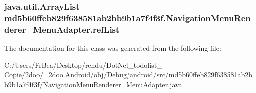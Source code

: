 \hypertarget{classmd5b60ffeb829f638581ab2bb9b1a7f4f3f_1_1_navigation_menu_renderer___menu_adapter_816f51fd01db11b07020f12e0694cf61}{
\subsubsection[{refList}]{\setlength{\rightskip}{0pt plus 5cm}java.util.ArrayList {\bf md5b60ffeb829f638581ab2bb9b1a7f4f3f.NavigationMenuRenderer\_\-MenuAdapter.refList}}}
\label{classmd5b60ffeb829f638581ab2bb9b1a7f4f3f_1_1_navigation_menu_renderer___menu_adapter_816f51fd01db11b07020f12e0694cf61}




The documentation for this class was generated from the following file:\begin{CompactItemize}
\item 
C:/Users/FrBea/Desktop/rendu/DotNet\_\-todolist\_ - Copie/2doo/\_\-2doo.Android/obj/Debug/android/src/md5b60ffeb829f638581ab2bb9b1a7f4f3f/\hyperlink{_navigation_menu_renderer___menu_adapter_8java}{NavigationMenuRenderer\_\-MenuAdapter.java}\end{CompactItemize}

